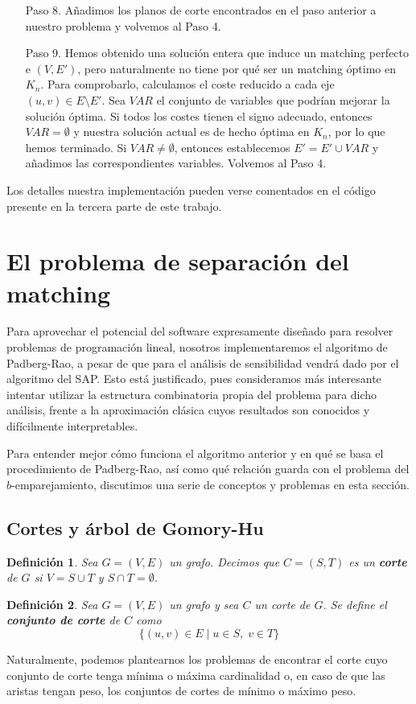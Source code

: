 \documentclass[twoside,a4paper,openright,12pt]{book}
\newtheorem{defi}{Definici\'on}[section]
\begin{document}
\begin{itemize}
\item[Paso 8.] Añadimos los planos de corte encontrados en el paso anterior a nuestro problema y volvemos al Paso 4.
\item[Paso 9.] Hemos obtenido una solución entera que induce un matching perfecto e $(V,E')$, pero naturalmente no tiene por qué ser un matching óptimo en $K_n$. Para comprobarlo, calculamos el coste reducido a cada eje $(u,v)\in E\setminus E'$. Sea $VAR$ el conjunto de variables que podrían mejorar la solución óptima. Si todos los costes tienen el signo adecuado, entonces $VAR=\emptyset$ y nuestra solución actual es de hecho óptima en $K_n$, por lo que hemos terminado. Si $VAR\neq \emptyset$, entonces establecemos $E'=E'\cup VAR$ y añadimos las correspondientes variables. Volvemos al Paso 4.
\end{itemize}
Los detalles nuestra implementación pueden verse comentados en el código presente en la tercera parte de este trabajo.
\section{El problema de separación del matching}
Para aprovechar el potencial del software expresamente diseñado para resolver problemas de programación lineal, nosotros implementaremos el algoritmo de Padberg-Rao, a pesar de que para el análisis de sensibilidad vendrá dado por el algoritmo del SAP. Esto está justificado, pues consideramos más interesante intentar utilizar la estructura combinatoria propia del problema para dicho análisis, frente a la aproximación clásica cuyos resultados son conocidos y difícilmente interpretables.

Para entender mejor cómo funciona el algoritmo anterior y en qué se basa el procedimiento de Padberg-Rao, así como qué relación guarda con el problema del $b$-emparejamiento, discutimos una serie de conceptos y problemas en esta sección.

\subsection{Cortes y árbol de Gomory-Hu} 
\begin{defi}
Sea $G = (V,E)$ un grafo. Decimos que $C=(S,T)$ es un \textbf{corte} de $G$ si $V = S \cup T$ y $S\cap T = \emptyset$.
\end{defi}
\begin{defi}
Sea $G=(V,E)$ un grafo y sea $C$ un corte de $G$. Se define el \textbf{conjunto de corte} de $C$ como
$$
\{(u,v)\in E \mid u \in S,\; v\in T\}
$$ 
\end{defi}
Naturalmente, podemos plantearnos los problemas de encontrar el corte cuyo conjunto de corte tenga mínima o máxima cardinalidad o, en caso de que las aristas tengan peso, los conjuntos de cortes de mínimo o máximo peso. 
\end{document}
